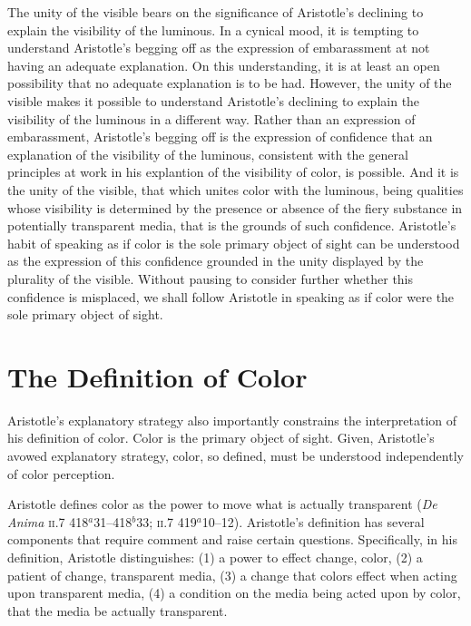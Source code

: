 The unity of the visible bears on the significance of Aristotle's declining to explain the visibility of the luminous. In a cynical mood, it is tempting to understand Aristotle's begging off as the expression of embarassment at not having an adequate explanation. On this understanding, it is at least an open possibility that no adequate explanation is to be had. However, the unity of the visible makes it possible to understand Aristotle's declining to explain the visibility of the luminous in a different way. Rather than an expression of embarassment, Aristotle's begging off is the expression of confidence that an explanation of the visibility of the luminous, consistent with the general principles at work in his explantion of the visibility of color, is possible. And it is the unity of the visible, that which unites color with the luminous, being qualities whose visibility is determined by the presence or absence of the fiery substance in potentially transparent media, that is the grounds of such confidence. Aristotle's habit of speaking as if color is the sole primary object of sight can be understood as the expression of this confidence grounded in the unity displayed by the plurality of the visible. Without pausing to consider further whether this confidence is misplaced, we shall follow Aristotle in speaking as if color were the sole primary object of sight.


\section{The Definition of Color} %
\label{sec:the_definition_of_color}

Aristotle's explanatory strategy also importantly constrains the interpretation of his definition of color. Color is the primary object of sight. Given, Aristotle's avowed explanatory strategy, color, so defined, must be understood independently of color perception.

Aristotle defines color as the power to move what is actually transparent (\emph{De Anima} \textsc{ii}.7 418\( ^{a} \)31--418\( ^{b} \)33; \textsc{ii}.7 419\( ^{a} \)10--12). Aristotle's definition has several components that require comment and raise certain questions. Specifically, in his definition, Aristotle distinguishes: (1) a power to effect change, color, (2) a patient of change, transparent media, (3) a change that colors effect when acting upon transparent media, (4) a condition on the media being acted upon by color, that the media be actually transparent.

